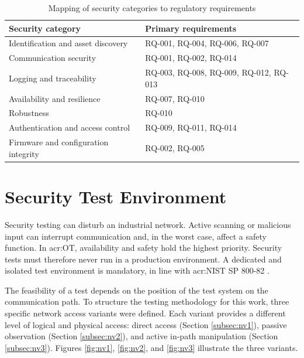 \begin{table}[H] 
	\caption{Mapping of security categories to regulatory requirements} 
	\label{tab:security_categories} 
	\centering 
	\begin{tabularx}{\textwidth}{l X} 
		\toprule 
		\textbf{Security category} & \textbf{Primary requirements} \\ 
		\midrule 
		Identification and asset discovery & RQ-001, RQ-004, RQ-006, RQ-007 \\ 
		\addlinespace 
		Communication security & RQ-001, RQ-002, RQ-014 \\ 
		\addlinespace 
		Logging and traceability & RQ-003, RQ-008, RQ-009, RQ-012, RQ-013 \\ 
		\addlinespace 
		Availability and resilience & RQ-007, RQ-010 \\ 
		\addlinespace 
		Robustness & RQ-010 \\ 
		\addlinespace 
		Authentication and access control & RQ-009, RQ-011, RQ-014 \\ 
		\addlinespace 
		Firmware and configuration integrity & RQ-002, RQ-005 \\ 
		\bottomrule 
	\end{tabularx} 
\end{table}


\section{Security Test Environment} 
\label{sec:test_environment} 


Security testing can disturb an industrial network. Active scanning or malicious input can interrupt communication and, in the worst case, affect a safety function. In \gls{acr:OT}, availability and safety hold the highest priority. Security tests must therefore never run in a production environment. A dedicated and isolated test environment is mandatory, in line with \gls{acr:NIST} SP 800-82 \cite[p. 2]{NIST.SP.800-82r3}. 

The feasibility of a test depends on the position of the test system on the communication path. To structure the testing methodology for this work, three specific network access variants were defined. Each variant provides a different level of logical and physical access: direct access (Section \ref{subsec:nv1}), passive observation (Section \ref{subsec:nv2}), and active in-path manipulation (Section \ref{subsec:nv3}). Figures \ref{fig:nv1}, \ref{fig:nv2}, and \ref{fig:nv3} illustrate the three variants. 


